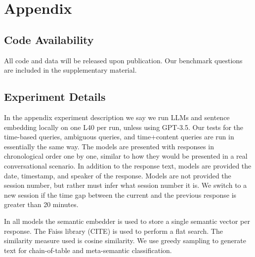 \documentclass{article}
\begin{document}

\appendix

\section{Appendix}

\subsection{Code Availability}
All code and data will be released upon publication. Our benchmark questions are included in the supplementary material. 

\subsection{Experiment Details}\label{app:exp_desc}

In the appendix experiment description we say we run LLMs and sentence embedding locally on one L40 per run, unless using GPT-3.5. Our tests for the time-based queries, ambiguous queries, and time+content queries are run in essentially the same way. The models are presented with responses in chronological order one by one, similar to how they would be presented in a real conversational scenario. In addition to the response text, models are provided the date, timestamp, and speaker of the response. Models are not provided the session number, but rather must infer what session number it is. We switch to a new session if the time gap between the current and the previous response is greater than 20 minutes. 

In all models the semantic embedder is used to store a single semantic vector per response. The Faiss library (CITE) is used to perform a flat search. The similarity measure used is cosine similarity. We use greedy sampling to generate text for chain-of-table and meta-semantic classification.
\end{document}

